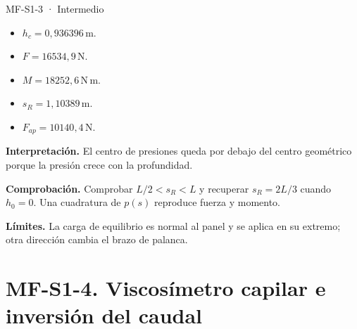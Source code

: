 \begin{studiumworked}{MF-S1-3 · Intermedio}
\begin{itemize}
\item $h_c=0{,}936396\,\mathrm{m}$.

\item $F=16534{,}9\,\mathrm{N}$.

\item $M=18252{,}6\,\mathrm{N\,m}$.

\item $s_R=1{,}10389\,\mathrm{m}$.

\item $F_{ap}=10140{,}4\,\mathrm{N}$.

\end{itemize}

\textbf{Interpretación.} El centro de presiones queda por debajo del centro geométrico porque la presión crece con la profundidad.

\textbf{Comprobación.} Comprobar $L/2<s_R<L$ y recuperar $s_R=2L/3$ cuando $h_0=0$. Una cuadratura de $p(s)$ reproduce fuerza y momento.

\textbf{Límites.} La carga de equilibrio es normal al panel y se aplica en su extremo; otra dirección cambia el brazo de palanca.

\end{studiumworked}

\Needspace{.30\textheight}\section{MF-S1-4. Viscosímetro capilar e inversión del caudal}

